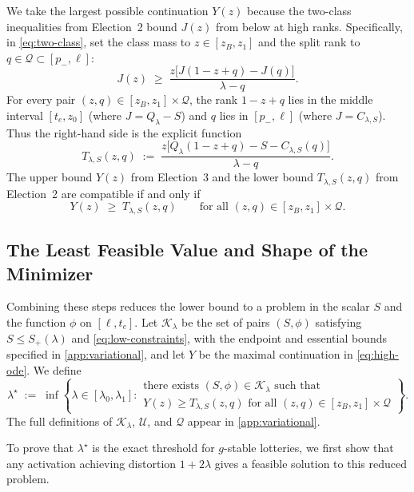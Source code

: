 \documentclass[11pt]{article}
\numberwithin{equation}{section}
\theoremstyle{plain}
\theoremstyle{definition}
\newcommand{\1}{\mathbf{1}}
\newcommand{\calK}{\mathcal{K}}
\newcommand{\calQ}{\mathcal{Q}}
\newcommand{\calU}{\mathcal{U}}
\begin{document}
We take the largest possible continuation $Y(z)$ because the two-class inequalities from Election~2 bound $J(z)$ from below at high ranks. Specifically, in \cref{eq:two-class}, set the class mass to $z \in [z_B, z_1]$ and the split rank to $q \in \calQ \subset [p_-, \ell]$:
\[
  J(z) \;\ge\; \frac{z\bigl[J(1 - z + q) - J(q)\bigr]}{\lambda - q}.
\]
For every pair $(z, q) \in [z_B, z_1] \times \calQ$, the rank $1 - z + q$ lies in the middle interval $[t_e, z_0]$ (where $J = Q_\lambda - S$) and $q$ lies in $[p_-, \ell]$ (where $J = C_{\lambda, S}$). Thus the right-hand side is the explicit function
\[
  T_{\lambda, S}(z, q) \;:=\; \frac{z\bigl[Q_\lambda(1 - z + q) - S - C_{\lambda, S}(q)\bigr]}{\lambda - q}.
\]
The upper bound $Y(z)$ from Election~3 and the lower bound $T_{\lambda, S}(z, q)$ from Election~2 are compatible if and only if
\begin{equation}
  Y(z) \;\ge\; T_{\lambda, S}(z, q)
  \qquad \text{for all } (z, q) \in [z_B, z_1] \times \calQ.
  \label{eq:high-binary-compatibility}
\end{equation}

\subsection{The Least Feasible Value and Shape of the Minimizer}
\label{sec:least-feasible}

Combining these steps reduces the lower bound to a problem in the scalar $S$ and the function $\phi$ on $[\ell, t_e]$. Let $\calK_\lambda$ be the set of pairs $(S, \phi)$ satisfying $S \le S_+(\lambda)$ and \cref{eq:low-constraints}, with the endpoint and essential bounds specified in \cref{app:variational}, and let $Y$ be the maximal continuation in \cref{eq:high-ode}. We define
\begin{equation}
  \lambda^\star \;:=\; \inf\left\{\lambda \in [\lambda_0, \lambda_1] :
  \begin{array}{l}
  \text{there exists } (S, \phi) \in \calK_\lambda \text{ such that}\\
  Y(z) \ge T_{\lambda, S}(z, q) \text{ for all } (z, q) \in [z_B, z_1] \times \calQ
  \end{array}\right\}.
  \label{eq:lambda-star-def}
\end{equation}
The full definitions of $\calK_\lambda$, $\calU$, and $\calQ$ appear in \cref{app:variational}.

To prove that $\lambda^\star$ is the exact threshold for $g$-stable lotteries, we first show that any activation achieving distortion $1 + 2\lambda$ gives a feasible solution to this reduced problem.
\end{document}
